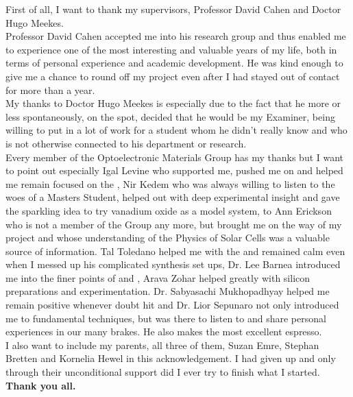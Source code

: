 
\begin{acknowledgements}
\addchaptertocentry{\acknowledgementname} %

First of all, I want to thank my supervisors, Professor David Cahen and Doctor Hugo Meekes.\\
Professor David Cahen accepted me into his research group and thus enabled me to experience one of the most interesting and valuable years of my life, both in terms of personal experience and academic development. He was kind enough to give me a chance to round off my project even after I had stayed out of contact for more than a year.\\
My thanks to Doctor Hugo Meekes is especially due to the fact that he more or less spontaneously, on the spot, decided that he would be my Examiner, being willing to put in a lot of work for a student whom he didn't really know and who is not otherwise connected to his department or research.\\
Every member of the Optoelectronic Materials Group has my thanks but I want to point out especially Igal Levine who supported me, pushed me on and helped me remain focused on the \McA{}, Nir Kedem who was always willing to listen to the woes of a Masters Student, helped out with deep experimental insight and gave the sparkling idea to try vanadium oxide as a model system, to Ann Erickson who is not a member of the Group any more, but brought me on the way of my project and whose understanding of the Physics of Solar Cells was a valuable source of information. Tal Toledano helped me with the \ftir{} and remained calm even when I messed up his complicated synthesis set ups, Dr. Lee Barnea introduced me into the finer points of \cpd{} and \spv{}, Arava Zohar helped greatly with silicon preparations and  experimentation. Dr. Sabyasachi  Mukhopadhyay helped me remain positive whenever doubt hit and Dr. Lior Sepunaro not only introduced me to fundamental techniques, but was there to listen to and share personal experiences in our many brakes. He also makes the most excellent espresso.\\
I also want to include my parents, all three of them, Suzan Emre, Stephan Bretten and Kornelia Hewel in this acknowledgement. I had given up and only through their unconditional support did I ever try to finish what I started.\\
\textbf{Thank you all.}

\end{acknowledgements}
